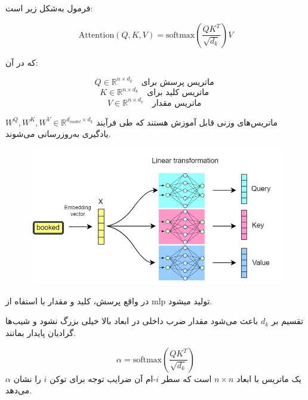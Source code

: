 فرمول به‌شکل زیر است:

\begin{equation}
	\text{Attention}(Q, K, V) = \text{softmax}\left( \frac{QK^T}{\sqrt{d_k}} \right) V
	\label{eq:attention}
\end{equation}

که در آن:

\[
Q \in \mathbb{R}^{n \times d_k} \quad \text{ماتریس پرسش برای }
\]
\[
K \in \mathbb{R}^{n \times d_k} \quad \text{ماتریس کلید برای }
\]
\[
V \in \mathbb{R}^{n \times d_v} \quad \text{ماتریس مقدار  }
\]



	 \( W^Q, W^K, W^V \in \mathbb{R}^{d_{model} \times d_k} \) ماتریس‌های وزنی قابل آموزش هستند که طی فرآیند یادگیری به‌روزرسانی می‌شوند.
	 
\begin{figure}[h]
	\centering
	\begin{minipage}[b]{0.7\textwidth}
		\centering
		\includegraphics[width=\textwidth]{transformer_images/qkv.png}
		\caption{}
		\label{fig:qkv}
	\end{minipage}
	\hfill
\end{figure}


در واقع پرسش، کلید و مقدار با استفاه از mlp  تولید میشود.



تقسیم بر \( d_k \) باعث می‌شود مقدار ضرب داخلی در ابعاد بالا خیلی بزرگ نشود و شیب‌ها گرادیان پایدار بمانند.

\begin{equation}
	\alpha = \text{softmax}\left( \frac{QK^T}{\sqrt{d_k}} \right)
	\label{eq:alpha}
\end{equation}
\(\alpha\) یک ماتریس با ابعاد \( n \times n \) است که سطر \( i \)-ام آن ضرایب توجه برای توکن \( i \) را نشان می‌دهد.

